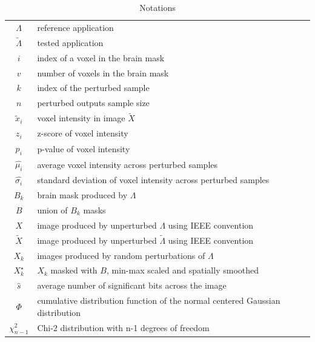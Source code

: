\documentclass{article}
\begin{document}
\begin{table}
    \centering
    \begin{tabular}{c|l}
        $\Lambda$        & reference application                                                         \\
        $\tilde \Lambda$ & tested application                                                            \\
        $i$              & index of a voxel in the brain mask                                            \\
        $v$              & number of voxels in the brain mask                                            \\
        $k$              & index of the perturbed sample                                                 \\
        $n$              & perturbed outputs sample size                                                 \\
        $\tilde x_i$     & voxel intensity in image $\tilde X$                                           \\
        $z_i$            & z-score of voxel intensity                                                    \\
        $p_i$            & p-value of voxel intensity                                                    \\
        $\hat{\mu_i}$    & average voxel intensity across perturbed samples                              \\
        $\hat{\sigma_i}$ & standard deviation of voxel intensity across perturbed samples                \\
        $B_k$            & brain mask produced by $\Lambda$                                              \\
        $B$              & union of $B_k$ masks                                                          \\
        $X$              & image produced by unperturbed $\Lambda$ using IEEE convention                 \\
        $\tilde X$       & image produced by unperturbed $\tilde \Lambda$ using IEEE convention          \\
        $X_k$            & images produced by random perturbations of $\Lambda$                          \\
        $X_k^{\star}$    & $X_k$ masked with $B$, min-max scaled and spatially smoothed                  \\
        $\hat{s}$        & average number of significant bits across the image                           \\
        $\Phi$           & cumulative distribution function of the normal centered Gaussian distribution \\
        $\chi^2_{n-1}$   & Chi-2 distribution with n-1 degrees of freedom                                \\
    \end{tabular}
    \caption{Notations}
    \label{tab:notations}
\end{table}
\end{document}
